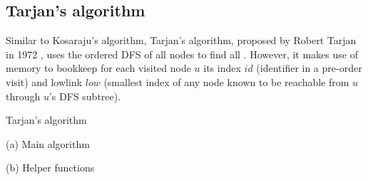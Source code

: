 \subsection{Tarjan's algorithm} \label{algorithm-scc-tarjan}
Similar to Kosaraju's algorithm, Tarjan's algorithm, proposed by Robert Tarjan in 1972 \cite{tarjan72}, uses the ordered DFS of all nodes to find all . However, it makes use of memory to bookkeep for each visited node $u$ its index $id$ (identifier in a pre-order visit) and lowlink $low$ (smallest index of any node known to be reachable from $u$ through $u$'s DFS subtree).
\begin{center}
    \begin{algorithm}[H]
        \caption{Tarjan's algorithm}
        \label{alg-tarjan}
        \begin{minipage}[t]{0.40\linewidth}
            (a) Main algorithm
            \begin{algorithmic}[1]
                    \EndFor
                        \EndIf
                    \EndFor
                    \State {}
                \EndFunction
            \end{algorithmic}
        \end{minipage}
        \begin{minipage}[t]{0.58\textwidth}
            (b) Helper functions
            \begin{algorithmic}[1]


\end{algorithmic}
\end{minipage}
\end{algorithm}
\end{center}
